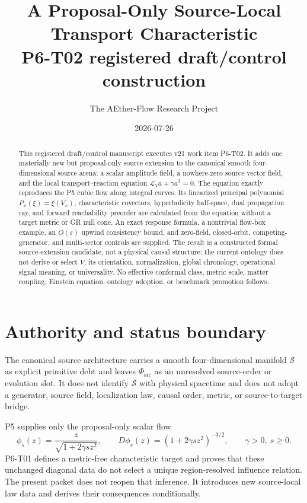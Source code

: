 \documentclass[11pt]{article}
\title{A Proposal-Only Source-Local Transport Characteristic\\
\large P6-T02 registered draft/control construction}
\author{The AEther-Flow Research Project}
\date{2026-07-26}
\newcommand{\Sub}{\mathcal S}
\newcommand{\Lie}{\mathcal L}
\begin{document}
\maketitle

\begin{abstract}
This registered draft/control manuscript executes v21 work item P6-T02.  It
adds one materially new but proposal-only source extension to the canonical
smooth four-dimensional source arena: a scalar amplitude field, a nowhere-zero
source vector field, and the local transport--reaction equation
\(\Lie_V a+\gamma a^3=0\).  The equation exactly reproduces the P5 cubic flow
along integral curves.  Its linearized principal polynomial
\(P_x(\xi)=\xi(V_x)\), characteristic covectors, hyperbolicity half-space,
dual propagation ray, and forward reachability preorder are calculated from
the equation without a target metric or GR null cone.  An exact response
formula, a nontrivial flow-box example, an \(O(\varepsilon)\) upwind
consistency bound, and zero-field, closed-orbit, competing-generator, and
multi-sector controls are supplied.  The result is a constructed formal
source-extension candidate, not a physical causal structure: the current
ontology does not derive or select \(V\), its orientation, normalization,
global chronology, operational signal meaning, or universality.  No
effective conformal class, metric scale, matter coupling, Einstein equation,
ontology adoption, or benchmark promotion follows.
\end{abstract}

\section{Authority and status boundary}

The canonical source architecture carries a smooth four-dimensional manifold
\(\Sub\) as explicit primitive debt and leaves \(\Phi_{\mathrm{src}}\) as an
unresolved source-order or evolution slot.  It does not identify \(\Sub\)
with physical spacetime and does not adopt a generator, source field,
localization law, causal order, metric, or source-to-target bridge.

P5 supplies only the proposal-only scalar flow
\[
 \phi_s(z)=\frac{z}{\sqrt{1+2\gamma s z^2}},
 \qquad
 D\phi_s(z)=(1+2\gamma s z^2)^{-3/2},
 \qquad \gamma>0,\ s\geq0.
\]
P6-T01 defines a metric-free characteristic target and proves that these
unchanged diagonal data do not select a unique region-resolved influence
relation.  The present packet does not reopen that inference.  It introduces
new source-local law data and derives their consequences conditionally.
\end{document}
